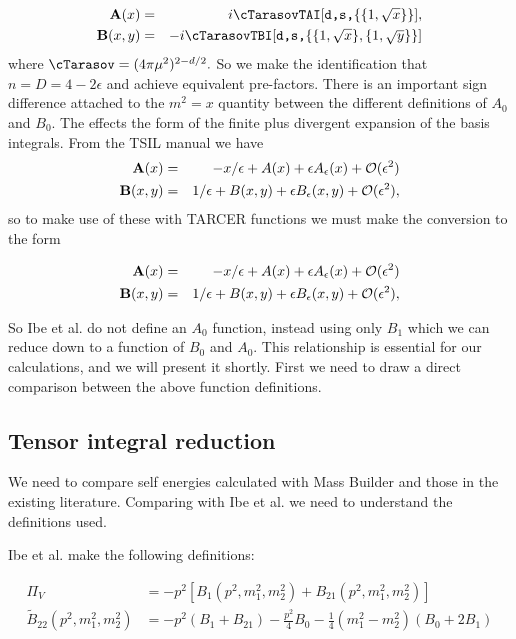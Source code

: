 \documentclass[11pt]{article}
\begin{document}
\begin{eqnarray}
{\bf A}(x) &=& i \cTarasov \mbox{{\tt TAI$[$d,s,$\{\{1,\sqrt{x}\}\}]$}},
\\
{\bf B}(x,y) &=& -i \cTarasov \mbox{{\tt TBI$[$d,s,$\{%
\{1,\sqrt{x}\},\{1,\sqrt{y}\}\}]$}} 
\end{eqnarray}
where 
$
\cTarasov = (4 \pi \mu^2)^{2-d/2}.
$
So we make the identification that $n=D=4-2\epsilon$ and achieve equivalent pre-factors.  There is an important sign difference attached to the $m^2=x$ quantity between the different definitions of $A_0$ and $B_0$.  The effects the form of the finite plus divergent expansion of the basis integrals.  From the TSIL manual we have
\begin{eqnarray}
{\bf A}(x) &=& -x/\epsilon + A(x) + \epsilon A_\epsilon(x) + 
{\cal O}(\epsilon^2) 
\\
{\bf B}(x,y) &=& 1/\epsilon + B(x,y) + \epsilon B_\epsilon(x,y) 
+ {\cal O}(\epsilon^2) ,
\end{eqnarray}
so to make use of these with TARCER functions we must make the conversion to the form

\begin{eqnarray}
{\bf A}(x) &=& -x/\epsilon + A(x) + \epsilon A_\epsilon(x) + 
{\cal O}(\epsilon^2) 
\\
{\bf B}(x,y) &=& 1/\epsilon + B(x,y) + \epsilon B_\epsilon(x,y) 
+ {\cal O}(\epsilon^2) ,
\end{eqnarray}


So Ibe et al. do not define an $A_0$ function, instead using only $B_1$ which we can reduce down to a function of $B_0$ and $A_0$.  This relationship is essential for our calculations, and we will present it shortly.  First we need to draw a direct comparison between the above function definitions.


\subsection{Tensor integral reduction}

We need to compare self energies calculated with Mass Builder and those in the existing literature.  Comparing with Ibe et al. we need to understand the definitions used.

Ibe et al. make the following definitions:	

\begin{align}
\Pi_V &= -p^2 \left[ B_1(p^2,m_1^2,m_2^2)+B_{21}(p^2,m_1^2,m_2^2)\right]\\
\tilde{B}_{22}(p^2,m_1^2,m_2^2)&= -p^2(B_1+B_{21})-\frac{p^2}{4}B_0-\frac{1}{4}(m_1^2-m_2^2)(B_0+2B_1)
\end{align}
\end{document}
